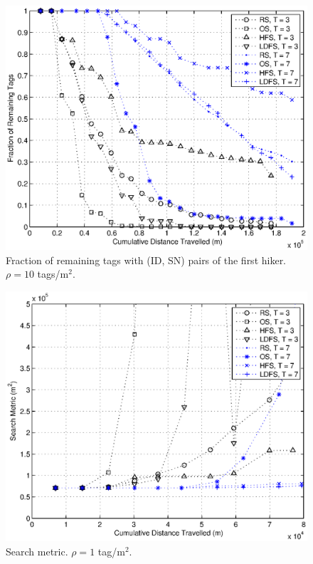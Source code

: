 \begin{figure}
\centering
\includegraphics[width=5in]{Chapter_2_Figures/frac_dense10.eps}
\caption{Fraction of remaining tags with (ID, SN) pairs of the first hiker. $\rho = 10$ tags/m$^2$.}
\label{Figure: frac_dense10.eps}
\end{figure}
\begin{figure}
\centering
\includegraphics[width=5in]{Chapter_2_Figures/search_dense01.eps}
\caption{Search metric. $\rho = 1$ tag/m$^2$.}
\label{Figure: search_dense01.eps}
\end{figure}
\clearpage

